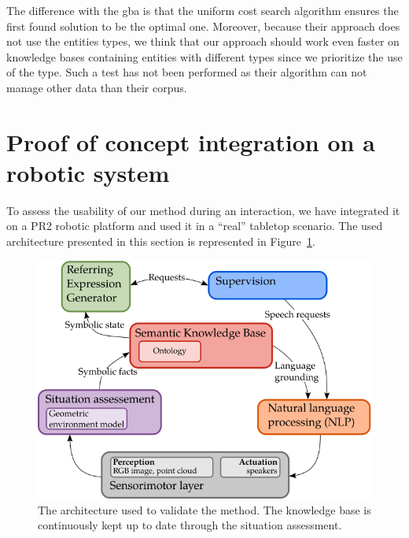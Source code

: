 The difference with the \acrshort{gba} is that the uniform cost search algorithm ensures the first found solution to be the optimal one. Moreover, because their approach does not use the entities types, we think that our approach should work even faster on knowledge bases containing entities with different types since we prioritize the use of the type. Such a test has not been performed as their algorithm can not manage other data than their corpus.

\section[Integration on a robotic system]{Proof of concept integration on a robotic system}

To assess the usability of our method during an interaction, we have integrated it on a PR2 robotic platform and used it in a ``real'' tabletop scenario. The used architecture presented in this section is represented in Figure~\ref{fig:chap4_archi}.

\begin{figure}[ht!]
\centering
\includegraphics[scale=0.6]{figures/chapter4/architecture.png}
\caption{\label{fig:chap4_archi} The architecture used to validate the method. The knowledge base is continuously kept up to date through the situation assessment.}
\end{figure}

